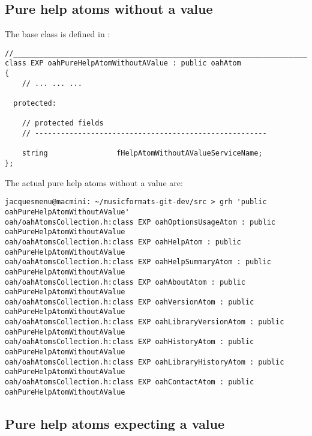 \subsection{Pure help atoms without a value}

The base  class is defined in :
\begin{lstlisting}[language=CPlusPlus]
//______________________________________________________________________________
class EXP oahPureHelpAtomWithoutAValue : public oahAtom
{
	// ... ... ...

  protected:

    // protected fields
    // ------------------------------------------------------

    string                fHelpAtomWithoutAValueServiceName;
};
\end{lstlisting}

The actual pure help atoms without a value are:
\begin{lstlisting}[language=Terminal]
jacquesmenu@macmini: ~/musicformats-git-dev/src > grh 'public oahPureHelpAtomWithoutAValue'
oah/oahAtomsCollection.h:class EXP oahOptionsUsageAtom : public oahPureHelpAtomWithoutAValue
oah/oahAtomsCollection.h:class EXP oahHelpAtom : public oahPureHelpAtomWithoutAValue
oah/oahAtomsCollection.h:class EXP oahHelpSummaryAtom : public oahPureHelpAtomWithoutAValue
oah/oahAtomsCollection.h:class EXP oahAboutAtom : public oahPureHelpAtomWithoutAValue
oah/oahAtomsCollection.h:class EXP oahVersionAtom : public oahPureHelpAtomWithoutAValue
oah/oahAtomsCollection.h:class EXP oahLibraryVersionAtom : public oahPureHelpAtomWithoutAValue
oah/oahAtomsCollection.h:class EXP oahHistoryAtom : public oahPureHelpAtomWithoutAValue
oah/oahAtomsCollection.h:class EXP oahLibraryHistoryAtom : public oahPureHelpAtomWithoutAValue
oah/oahAtomsCollection.h:class EXP oahContactAtom : public oahPureHelpAtomWithoutAValue
\end{lstlisting}


\subsection{Pure help atoms expecting a value}

